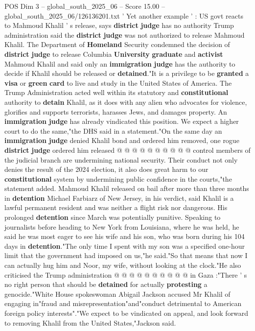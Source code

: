 \begin{textsample}{POS Dim 3 – global\_south\_2025\_06 – Score 15.00 – global\_south\_2025\_06/126136201.txt}  \label{ex:f3_pos_205}
' Yet another example ' : US govt reacts to Mahmoud Khalil ' s release, says \textbf{district} \textbf{judge} has no authority Trump administration said the \textbf{district} \textbf{judge} was not authorized to release Mahmoud Khalil.
The Department of \textbf{Homeland} Security condemned the decision of \textbf{district} \textbf{judge} to release Columbia \textbf{University} \textbf{graduate} and \textbf{activist} Mahmoud Khalil and said only an \textbf{immigration} \textbf{judge} has the authority to decide if Khalil should be released or \textbf{detained}."It is a privilege to be \textbf{granted} a \textbf{visa} or \textbf{green} \textbf{card} to live and study in the United States of America.
The Trump Administration acted well within its statutory and \textbf{constitutional} authority to \textbf{detain} Khalil, as it does with any alien who advocates for violence, glorifies and supports terrorists, harasses Jews, and damages property.
An \textbf{immigration} \textbf{judge} has already vindicated this position.
We expect a higher court to do the same,"the DHS said in a statement."On the same day an \textbf{immigration} \textbf{judge} denied Khalil bond and ordered him removed, one rogue \textbf{district} \textbf{judge} ordered him released @ @ @ @ @ @ @ @ @ @ control members of the judicial branch are undermining national security.
Their conduct not only denies the result of the 2024 election, it also does great harm to our \textbf{constitutional} system by undermining public confidence in the courts,"the statement added.
Mahmoud Khalil released on bail after more than three months in \textbf{detention} Michael Farbiarz of New Jersey, in his verdict, said Khalil is a lawful permanent resident and was neither a flight risk nor dangerous.
His prolonged \textbf{detention} since March was potentially punitive.
Speaking to journalists before heading to New York from Louisiana, where he was held, he said he was most eager to see his wife and his son, who was born during his 104 days in \textbf{detention}."The only time I spent with my son was a specified one-hour limit that the government had imposed on us,"he said."So that means that now I can actually hug him and Noor, my wife, without looking at the clock."He also criticised the Trump administration @ @ @ @ @ @ @ @ @ @ in Gaza :"There ' s no right person that should be \textbf{detained} for actually \textbf{protesting} a genocide."White House spokeswoman Abigail Jackson accused Mr Khalil of engaging in"fraud and misrepresentation"and"conduct detrimental to American foreign policy interests"."We expect to be vindicated on appeal, and look forward to removing Khalil from the United States,"Jackson said.

\end{textsample}
